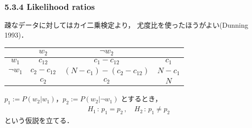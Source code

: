 \documentclass[10pt,leqno]{beamer}
\begin{document}
\begin{frame}
    \frametitle{5.3.4 Likelihood ratios}
    疎なデータに対してはカイ二乗検定より，
    尤度比を使ったほうがよい(Dunning 1993)．
    \begin{table}
        \begin{tabular}{|c|c|c|c|}
            \hline
                          &    $w_2$       &  $\lnot w_2$                                      &   \\
            \hline
            $w_1$         &   $c_{12}$     & $c_1 - c_{12}$                                    &   $c_1$ \\
            \hline
            $\lnot{w_1}$  & $c_2 - c_{12}$ & $\left(N -c_1\right) - \left(c_2 - c_{12}\right)$ &  $N - c_1$ \\
            \hline
                          &     $c_2$      &     $c_2$                                         &    $N$ \\
            \hline
        \end{tabular}
    \end{table}
    $p_1 := P(w_2 | w_1)$，$p_2 := P(w_2 | \lnot w_1)$ とするとき，
    \begin{align*}
        H_1 \,:\, p_1 = p_2\,,\quad H_2 \,:\, p_1 \neq p_2
    \end{align*}
    という仮説を立てる．
\end{frame}
\end{document}
